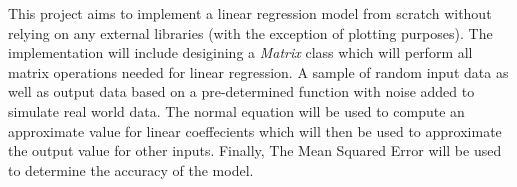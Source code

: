 This project aims to implement a linear regression model from scratch without relying on any external libraries (with the exception of plotting purposes). The implementation will include desigining a \textit{Matrix} class which will perform all matrix operations needed for linear regression.
A sample of random input data as well as output data based on a pre-determined function with noise added to simulate real world data. The normal equation will be used to compute an approximate value for linear coeffecients which will then be used to approximate the output value for other inputs. Finally, The Mean Squared Error will be used to determine the accuracy of the model.